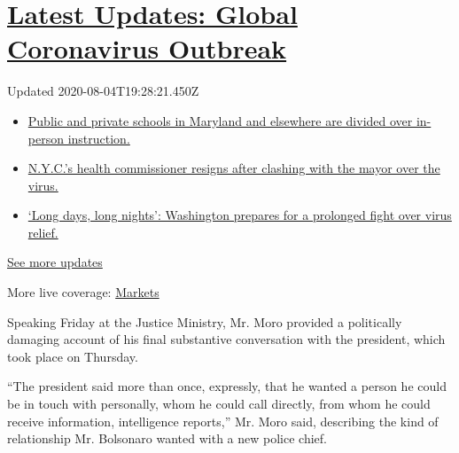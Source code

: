 \hypertarget{latest-updates-global-coronavirus-outbreak}{%
\section{\texorpdfstring{\href{https://www.nytimes.com/2020/08/04/world/coronavirus-cases.html?action=click\&pgtype=Article\&state=default\&region=MAIN_CONTENT_1\&context=storylines_live_updates}{Latest
Updates: Global Coronavirus
Outbreak}}{Latest Updates: Global Coronavirus Outbreak}}\label{latest-updates-global-coronavirus-outbreak}}

Updated 2020-08-04T19:28:21.450Z

\begin{itemize}
\tightlist
\item
  \href{https://www.nytimes.com/2020/08/04/world/coronavirus-cases.html?action=click\&pgtype=Article\&state=default\&region=MAIN_CONTENT_1\&context=storylines_live_updates\#link-4825b93}{Public
  and private schools in Maryland and elsewhere are divided over
  in-person instruction.}
\item
  \href{https://www.nytimes.com/2020/08/04/world/coronavirus-cases.html?action=click\&pgtype=Article\&state=default\&region=MAIN_CONTENT_1\&context=storylines_live_updates\#link-4d1eafa8}{N.Y.C.'s
  health commissioner resigns after clashing with the mayor over the
  virus.}
\item
  \href{https://www.nytimes.com/2020/08/04/world/coronavirus-cases.html?action=click\&pgtype=Article\&state=default\&region=MAIN_CONTENT_1\&context=storylines_live_updates\#link-6b644638}{`Long
  days, long nights': Washington prepares for a prolonged fight over
  virus relief.}
\end{itemize}

\href{https://www.nytimes.com/2020/08/04/world/coronavirus-cases.html?action=click\&pgtype=Article\&state=default\&region=MAIN_CONTENT_1\&context=storylines_live_updates}{See
more updates}

More live coverage:
\href{https://www.nytimes.com/live/2020/08/04/business/stock-market-today-coronavirus?action=click\&pgtype=Article\&state=default\&region=MAIN_CONTENT_1\&context=storylines_live_updates}{Markets}

Speaking Friday at the Justice Ministry, Mr. Moro provided a politically
damaging account of his final substantive conversation with the
president, which took place on Thursday.

``The president said more than once, expressly, that he wanted a person
he could be in touch with personally, whom he could call directly, from
whom he could receive information, intelligence reports,'' Mr. Moro
said, describing the kind of relationship Mr. Bolsonaro wanted with a
new police chief.

